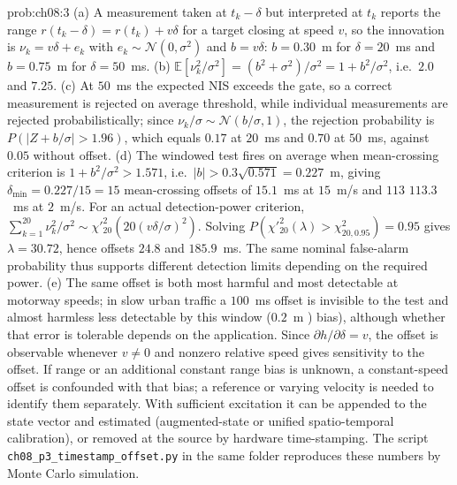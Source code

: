 \documentclass[graybox,envcountchap]{style/SNmono}
\newcommand{\repopath}[1]{\texttt{#1}}
\providecommand{\DIFadd}[1]{{\protect\color{blue} #1}} %
\providecommand{\DIFdel}[1]{{\protect\color{red} #1}} %
\providecommand{\DIFaddbegin}{} %
\providecommand{\DIFaddend}{} %
\providecommand{\DIFdelbegin}{} %
\providecommand{\DIFdelend}{} %
\begin{document}
\begin{sol}{prob:ch08:3}
(a) A measurement taken at $t_k-\delta$ but interpreted at $t_k$ reports the range $r(t_k-\delta)=r(t_k)+v\delta$ for a target closing at speed $v$, so the innovation is $\nu_k=v\delta+e_k$ with $e_k\sim\mathcal{N}(0,\sigma^2)$ and $b=v\delta$: $b=0.30$~m for $\delta=20$~ms and $b=0.75$~m for $\delta=50$~ms. (b) $\mathbb{E}[\nu_k^2/\sigma^2]=(b^2+\sigma^2)/\sigma^2=1+b^2/\sigma^2$, i.e.\ $2.0$ and $7.25$. (c) At $50$~ms the expected NIS exceeds the \DIFdelbegin \DIFdel{gate, so a correct measurement is rejected on average}\DIFdelend \DIFaddbegin \DIFadd{threshold, while individual measurements are rejected probabilistically}\DIFaddend ; since $\nu_k/\sigma\sim\mathcal{N}(b/\sigma,1)$, the rejection probability is $P(\lvert Z+b/\sigma\rvert>1.96)$, which equals $0.17$ at $20$~ms and $0.70$ at $50$~ms, against $0.05$ without offset. (d) The \DIFdelbegin \DIFdel{windowed test fires on average when }\DIFdelend \DIFaddbegin \DIFadd{mean-crossing criterion is }\DIFaddend $1+b^2/\sigma^2>1.571$, i.e.\ $\lvert b\rvert>0.3\sqrt{0.571}=0.227$~m, giving \DIFdelbegin \DIFdel{$\delta_{\min}=0.227/15=15$}\DIFdelend \DIFaddbegin \DIFadd{mean-crossing offsets of $15.1$}\DIFaddend ~ms at $15$~m/s and \DIFdelbegin \DIFdel{$113$}\DIFdelend \DIFaddbegin \DIFadd{$113.3$}\DIFaddend ~ms at $2$~m/s. \DIFaddbegin \DIFadd{For an actual detection-power criterion, $\sum_{k=1}^{20}\nu_k^2/\sigma^2\sim\chi'^2_{20}(20(v\delta/\sigma)^2)$. Solving $P(\chi'^2_{20}(\lambda)>\chi^2_{20,0.95})=0.95$ gives $\lambda=30.72$, hence offsets $24.8$ and $185.9$~ms. The same nominal false-alarm probability thus supports different detection limits depending on the required power. }\DIFaddend (e) The same offset is both most harmful and most detectable at motorway speeds; in slow urban traffic a $100$~ms offset is \DIFdelbegin \DIFdel{invisible to the test and almost harmless }\DIFdelend \DIFaddbegin \DIFadd{less detectable by this window }\DIFaddend ($0.2$~m \DIFdelbegin \DIFdel{)}\DIFdelend \DIFaddbegin \DIFadd{bias), although whether that error is tolerable depends on the application}\DIFaddend . Since $\partial h/\partial\delta=v$, \DIFdelbegin \DIFdel{the offset is observable whenever $v\neq0$ and }\DIFdelend \DIFaddbegin \DIFadd{nonzero relative speed gives sensitivity to the offset. If range or an additional constant range bias is unknown, a constant-speed offset is confounded with that bias; a reference or varying velocity is needed to identify them separately. With sufficient excitation it }\DIFaddend can be appended to the state vector and estimated (augmented-state or unified spatio-temporal calibration), or removed at the source by hardware time-stamping. The script \repopath{ch08\_\allowbreak p3\_\allowbreak timestamp\_\allowbreak offset.py} in the same folder reproduces these numbers by Monte Carlo simulation.
\end{sol}
\end{document}
